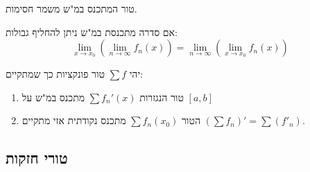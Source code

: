 \documentclass{tstextbook}
\begin{document}
\begin{proposition}
טור המתכנס במ"ש משמר חסימות.

\end{proposition}
\begin{proposition}
אם סדרה מתכנסת במ"ש ניתן להחליף גבולות:
$$\operatorname*{lim}_{x\to x_{0}}\left(\operatorname*{lim}_{n\to\infty}f_{n}(x)\right)=\operatorname*{lim}_{n\to\infty}\left(\operatorname*{lim}_{x\to x_{0}}f_{n}(x)\right)$$

\end{proposition}
\begin{proposition}
יהי \(\sum f\) טור פונקציות כך שמתקיים:

  \begin{enumerate}
    \item טור הנגזרות  \(\sum f_n'(x)\) מתכנס במ"ש על \([a,b]\)


    \item הטור \(\sum f_n(x_0)\) מתכנס נקודתית 
אזי מתקיים \(\left( \sum f_{n} \right)'=\sum(f'_{n})\).


  \end{enumerate}
\end{proposition}
\subsection{טורי חזקות}
\end{document}

